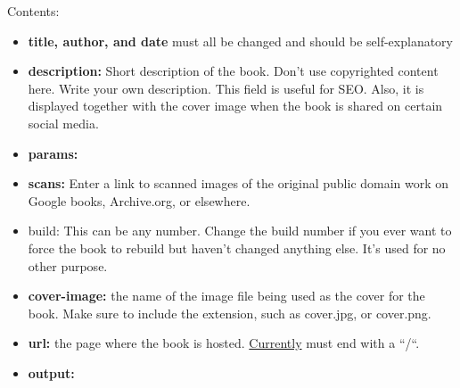 \documentclass[
]{book}
\providecommand{\tightlist}{%
  \setlength{\itemsep}{0pt}\setlength{\parskip}{0pt}}
\begin{document}
\begin{description}
Contents:

\begin{itemize}
\tightlist
\item
  \textbf{title, author, and date} must all be changed and should be self-explanatory
\end{itemize}

\begin{itemize}
\tightlist
\item
  \textbf{description:} Short description of the book. Don't use copyrighted content here. Write your own description. This field is useful for SEO. Also, it is displayed together with the cover image when the book is shared on certain social media.
\end{itemize}

\begin{itemize}
\tightlist
\item
  \textbf{params:}
\end{itemize}

\begin{itemize}
\tightlist
\item
  \textbf{scans:} Enter a link to scanned images of the original public domain work on Google books, Archive.org, or elsewhere.
\end{itemize}

\begin{itemize}
\tightlist
\item
  build: This can be any number. Change the build number if you ever want to force the book to rebuild but haven't changed anything else. It's used for no other purpose.
\end{itemize}

\begin{itemize}
\tightlist
\item
  \textbf{cover-image:} the name of the image file being used as the cover for the book. Make sure to include the extension, such as cover.jpg, or cover.png.
\end{itemize}

\begin{itemize}
\tightlist
\item
  \textbf{url:} the page where the book is hosted. \href{https://github.com/rstudio/bookdown/issues/963}{Currently} must end with a ``/``.
\end{itemize}

\begin{itemize}
\tightlist
\item
  \textbf{output:}


\end{itemize}
\end{description}
\end{document}
